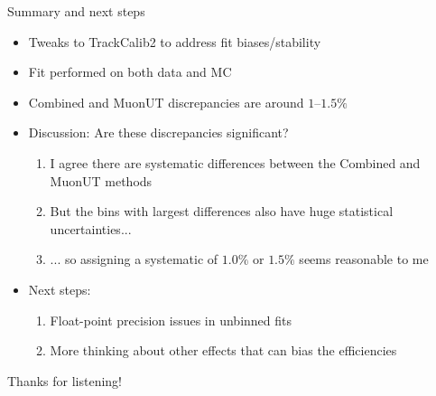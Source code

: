 \documentclass[xcolor={dvipsnames}]{beamer}
\begin{document}
\begin{frame}{Summary and next steps}
  \vspace{0.0cm}
  \begin{itemize}
    \setlength\itemsep{0.7em}
    \item{Tweaks to TrackCalib2 to address fit biases/stability}
    \item{Fit performed on both data and MC}
    \item{Combined and MuonUT discrepancies are around $1$--$1.5\%$}
    \item{Discussion: Are these discrepancies significant?}
    \begin{enumerate}
      \item{I agree there are systematic differences between the Combined and MuonUT methods}
      \item{But the bins with largest differences also have huge statistical uncertainties...}
      \item{... so assigning a systematic of $1.0\%$ or $1.5\%$ seems reasonable to me}
    \end{enumerate}
    \item{Next steps:}
    \begin{enumerate}
      \item{Float-point precision issues in unbinned fits}
      \item{More thinking about other effects that can bias the efficiencies}
    \end{enumerate}
  \end{itemize}
  \vspace{0.3cm}
  \begin{center}
    \Huge Thanks for listening!
  \end{center}
\end{frame}
\end{document}
